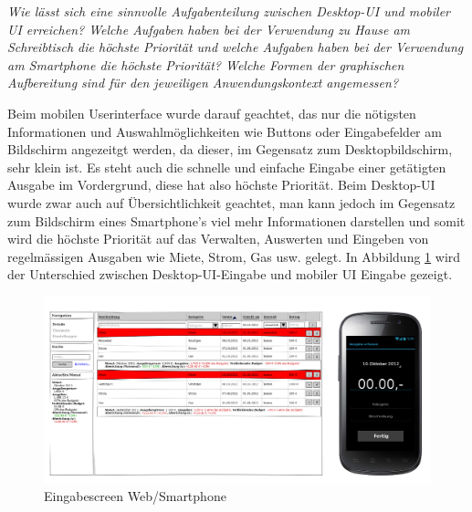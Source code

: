 \emph{Wie lässt sich eine sinnvolle Aufgabenteilung zwischen Desktop-UI und mobiler UI erreichen?
Welche Aufgaben haben bei der Verwendung zu Hause am Schreibtisch die höchste Priorität und welche
Aufgaben haben bei der Verwendung am Smartphone die höchste Priorität? Welche Formen der graphischen
Aufbereitung sind für den jeweiligen Anwendungskontext angemessen?}

\vspace{2mm}

Beim mobilen Userinterface wurde darauf geachtet, das nur die n\"otigsten Informationen und
Auswahlm\"oglichkeiten wie Buttons oder Eingabefelder am Bildschirm angezeitgt werden, da dieser,
im Gegensatz zum Desktopbildschirm, sehr klein ist. Es steht auch die schnelle und einfache
Eingabe einer get\"atigten Ausgabe im Vordergrund, diese hat also h\"ochste Priorit\"at.
Beim Desktop-UI wurde zwar auch auf \"Ubersichtlichkeit geachtet, man kann jedoch im Gegensatz
zum Bildschirm eines Smartphone's viel mehr Informationen darstellen und somit wird die h\"ochste
Priorit\"at auf das Verwalten, Auswerten und Eingeben von regelm\"assigen Ausgaben wie Miete, Strom,
Gas usw. gelegt. In Abbildung \ref{fig:smartphone_web_comparison} wird der Unterschied zwischen Desktop-UI-Eingabe und mobiler UI Eingabe gezeigt.

\begin{figure}[htl]
\centering
\includegraphics[width=\textwidth]{img/smartphone_web_comparison}
\caption{Eingabescreen Web/Smartphone}
\label{fig:smartphone_web_comparison}
\end{figure}
